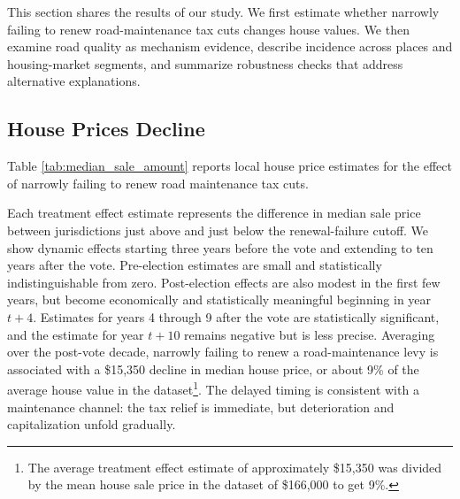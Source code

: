 This section shares the results of our study. We first estimate whether narrowly failing to renew road-maintenance tax cuts changes house values. We then examine road quality as mechanism evidence, describe incidence across places and housing-market segments, and summarize robustness checks that address alternative explanations.

\subsection{House Prices Decline}

Table \ref{tab:median_sale_amount} reports local house price estimates for the effect of narrowly failing to renew road maintenance tax cuts.

\noindent Each treatment effect estimate represents the difference in median sale price between jurisdictions just above and just below the renewal-failure cutoff. We show dynamic effects starting three years before the vote and extending to ten years after the vote. Pre-election estimates are small and statistically indistinguishable from zero. Post-election effects are also modest in the first few years, but become economically and statistically meaningful beginning in year $t+4$. Estimates for years 4 through 9 after the vote are statistically significant, and the estimate for year $t+10$ remains negative but is less precise. Averaging over the post-vote decade, narrowly failing to renew a road-maintenance levy is associated with a \$15,350 decline in median house price, or about 9\% of the average house value in the dataset\footnote{The average treatment effect estimate of approximately \$15,350 was divided by the mean house sale price in the dataset of \$166,000 to get 9\%.}. The delayed timing is consistent with a maintenance channel: the tax relief is immediate, but deterioration and capitalization unfold gradually.

